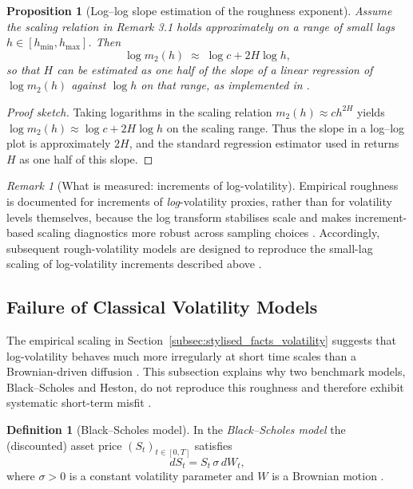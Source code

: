 \documentclass[12pt,a4paper]{article}
\theoremstyle{definition}
\newtheorem{definition}{Definition}[section]
\theoremstyle{plain}
\newtheorem{proposition}{Proposition}[section]
\theoremstyle{remark}
\newtheorem{remark}{Remark}[section]
\theoremstyle{plain}
\begin{document}
\begin{proposition}[Log--log slope estimation of the roughness exponent]
\label{prop:loglog_estimation}
Assume the scaling relation in Remark 3.1 holds approximately on a range of small lags $h\in[h_{\min},h_{\max}]$.
Then
\[
\log m_2(h)\;\approx\;\log c + 2H\log h,
\]
so that $H$ can be estimated as one half of the slope of a linear regression of $\log m_2(h)$ against $\log h$ on that range, as implemented in \cite{GatheralRough}.
\end{proposition}

\begin{proof}[Proof sketch]
Taking logarithms in the scaling relation $m_2(h)\approx c h^{2H}$ yields $\log m_2(h)\approx \log c + 2H\log h$ on the scaling range.
Thus the slope in a log--log plot is approximately $2H$, and the standard regression estimator used in \cite{GatheralRough} returns $H$ as one half of this slope.
\end{proof}

\begin{remark}[What is measured: increments of log-volatility]
\label{rem:why_log_vol}
Empirical roughness is documented for increments of \emph{log}-volatility proxies, rather than for volatility levels themselves, because the log transform stabilises scale and makes increment-based scaling diagnostics more robust across sampling choices \cite{GatheralRough}.
Accordingly, subsequent rough-volatility models are designed to reproduce the small-lag scaling of log-volatility increments described above \cite{GatheralRough}.
\end{remark}

\subsection{Failure of Classical Volatility Models}
\label{subsec:failure_classical_models}

The empirical scaling in Section~\ref{subsec:stylised_facts_volatility} suggests that log-volatility behaves much more irregularly at short time scales than a Brownian-driven diffusion \cite{GatheralRough}. 
This subsection explains why two benchmark models, Black--Scholes and Heston, do not reproduce this roughness and therefore exhibit systematic short-term misfit \cite{GatheralRough,BayerFriz2016}.

\begin{definition}[Black--Scholes model]
\label{def:black_scholes_model}
In the \emph{Black--Scholes model} the (discounted) asset price $(S_t)_{t\in[0,T]}$ satisfies
\[
dS_t = S_t\,\sigma\, dW_t,
\]
where $\sigma>0$ is a constant volatility parameter and $W$ is a Brownian motion \cite{BlackScholes1973}.
\end{definition}
\end{document}
